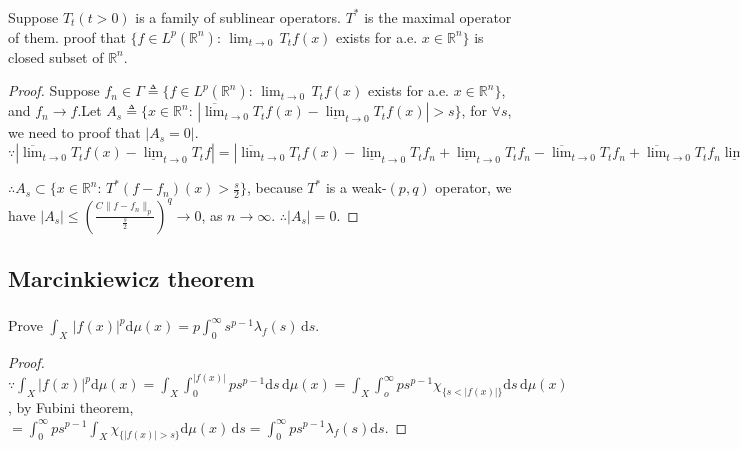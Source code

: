\documentclass{amsart}
\theoremstyle{definition}
\theoremstyle{remark}
\numberwithin{equation}{section}
\begin{document}
\subsubsection{}
Suppose $T_t(t>0)$ is a family of sublinear operators. $T^*$ is the maximal operator of them. proof that $\{f\in L^p(\mathbb{R}^n):\,\lim_{t\to 0}\,T_t f(x)$ exists for a.e. $ x\in \mathbb{R}^n\}$ is closed subset of $\mathbb{R}^n$.
\begin{proof} Suppose $f_n\in \Gamma\triangleq\{f\in L^p(\mathbb{R}^n):\,\lim_{t\to 0}\,T_t f(x)$ exists for a.e. $ x\in \mathbb{R}^n\}$, and $f_n \to f$.Let $A_s\triangleq\{x\in\mathbb{R}^n:\,|\overline{\lim}_{t\to 0} T_t f(x)-\underline{\lim}_{t\to 0} T_t f(x)|>s\}$, for $\forall s$, we need to proof that $|A_s=0|$.
$
\because|\overline{\lim}_{t\to 0} T_t f(x)-\underline{\lim}_{t\to 0} T_t f|
=|\overline{\lim}_{t\to 0} T_t f(x)-\underline{\lim}_{t\to 0} T_t f_n+\underline{\lim}_{t\to 0} T_t f_n-\overline{\lim}_{t\to 0} T_t f_n+\overline{\lim}_{t\to 0} T_t f_n\underline{\lim}_{t\to 0} T_t f|\leq |\overline{\lim}_{t\to 0} T_t f(x)-\underline{\lim}_{t\to 0} T_t f_n|+|\underline{\lim}_{t\to 0} T_t f_n-\overline{\lim}_{t\to 0} T_t f_n|+|\overline{\lim}_{t\to 0} T_t f_n\underline{\lim}_{t\to 0} T_t f|=|\overline{\lim}_{t\to 0} T_t f(x)-\underline{\lim}_{t\to 0} T_t f_n|+|\overline{\lim}_{t\to 0} T_t f_n\underline{\lim}_{t\to 0} T_t f|\leq |\overline{\lim}_{t\to 0} T_t (f-f_n)|+|\overline{\lim}_{t\to 0} T_t(f_n-f)|\leq 2T^*(f-f_n)
$

$\therefore A_s\subset \{x\in\mathbb{R}^n:\,T^*(f-f_n)(x)>\frac{s}{2}\}$, because $T^*$ is a weak-$(p,q)$ operator, we have $|A_s|\leq(\frac{C\|f-f_n\|_p}{\frac{s}{2}})^q\to 0$, as $n\to \infty$. $\therefore |A_s|=0$.
\end{proof}
\subsection{Marcinkiewicz theorem}
\subsubsection{}
Prove $\int_X\,|f(x)|^p\mathrm{d}\mu(x)=p\int_0^{\infty}s^{p-1}\lambda_f(s)\,\mathrm{d}s$.
\begin{proof}
$\because \int_X |f(x)|^p\mathrm{d}\mu(x)=\int_X \int_0^{|f(x)|} ps^{p-1}\mathrm{d}s\,\mathrm{d}\mu(x)=\int_X\int_o^{\infty}ps^{p-1}\chi_{\{s<|f(x)|\}}\mathrm{d}s\,\mathrm{d}\mu(x)$, by Fubini theorem, $=\int_{0}^{\infty}ps^{p-1}\int_X \chi_{\{|f(x)|>s\}}\mathrm{d}\mu(x)\,\mathrm{d}s=\int_{0}^{\infty} ps^{p-1}\lambda_f(s)\mathrm{d}s$.
\end{proof}
\end{document}
